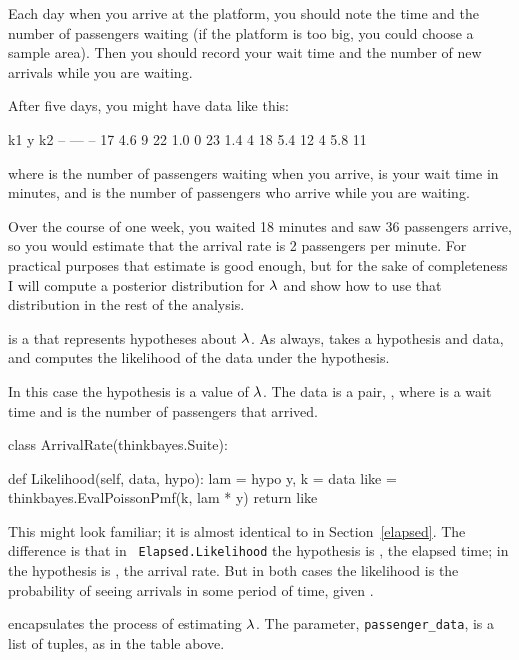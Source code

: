 \documentclass[12pt]{book}
\theoremstyle{exercise}
\begin{document}
Each day when you arrive at the platform, you should note the
time and the number of passengers waiting (if the platform is too
big, you could choose a sample area).  Then you should record your
wait time and the
number of new arrivals while you are waiting.

After five days, you might have data like this:
%
\begin{code}
k1      y     k2
--     ---    --
17     4.6     9
22     1.0     0
23     1.4     4
18     5.4    12
4      5.8    11
\end{code}
%
where  is the number of passengers waiting when you arrive,
 is your wait time in minutes, and  is the number of
passengers who arrive while you are waiting.

Over the course of one week, you waited 18 minutes and saw 36
passengers arrive, so you would estimate that the arrival rate is
2 passengers per minute.  For practical purposes that estimate is
good enough, but for the sake of completeness I
will compute a posterior distribution for $\mathtt{\lambda}$ and show how
to use that distribution in the rest of the analysis.

 is a  that represents hypotheses about
$\mathtt{\lambda}$.  As always,  takes a hypothesis and data,
and computes the likelihood of the data under the hypothesis.

In this case the hypothesis is a value of $\mathtt{\lambda}$.  The data is a
pair, , where  is a wait time and  is the
number of passengers that arrived.

\begin{code}
class ArrivalRate(thinkbayes.Suite):

    def Likelihood(self, data, hypo):
        lam = hypo
        y, k = data
        like = thinkbayes.EvalPoissonPmf(k, lam * y)
        return like
\end{code}

This  might look familiar; it
is almost identical to  in
Section~\ref{elapsed}.  The difference is that in {\tt
  Elapsed.Likelihood} the hypothesis is , the elapsed time; in
 the hypothesis is , the arrival
rate.  But in both cases the likelihood is the probability of seeing
 arrivals in some period of time, given .

 encapsulates the process of estimating
$\mathtt{\lambda}$.  The parameter, \verb"passenger_data", is a list
of  tuples, as in the table above.
\end{document}
